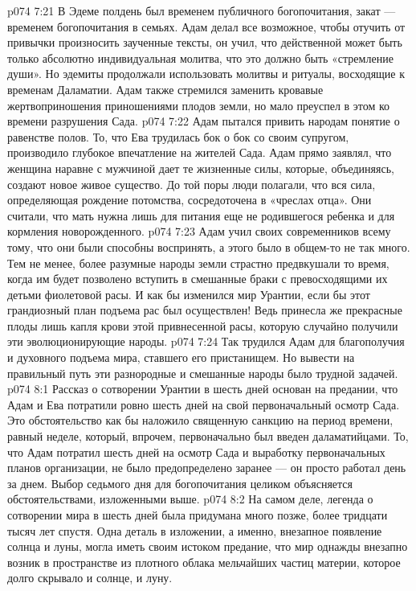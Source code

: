 \vs p074 7:21 В Эдеме полдень был временем публичного богопочитания, закат --- временем богопочитания в семьях. Адам делал все возможное, чтобы отучить от привычки произносить заученные тексты, он учил, что действенной может быть только абсолютно индивидуальная молитва, что это должно быть «стремление души». Но эдемиты продолжали использовать молитвы и ритуалы, восходящие к временам Даламатии. Адам также стремился заменить кровавые жертвоприношения приношениями плодов земли, но мало преуспел в этом ко времени разрушения Сада.
\vs p074 7:22 \pc Адам пытался привить народам понятие о равенстве полов. То, что Ева трудилась бок о бок со своим супругом, производило глубокое впечатление на жителей Сада. Адам прямо заявлял, что женщина наравне с мужчиной дает те жизненные силы, которые, объединяясь, создают новое живое существо. До той поры люди полагали, что вся сила, определяющая рождение потомства, сосредоточена в «чреслах отца». Они считали, что мать нужна лишь для питания еще не родившегося ребенка и для кормления новорожденного.
\vs p074 7:23 Адам учил своих современников всему тому, что они были способны воспринять, а этого было в общем\hyp{}то не так много. Тем не менее, более разумные народы земли страстно предвкушали то время, когда им будет позволено вступить в смешанные браки с превосходящими их детьми фиолетовой расы. И как бы изменился мир Урантии, если бы этот грандиозный план подъема рас был осуществлен! Ведь принесла же прекрасные плоды лишь капля крови этой привнесенной расы, которую случайно получили эти эволюционирующие народы.
\vs p074 7:24 Так трудился Адам для благополучия и духовного подъема мира, ставшего его пристанищем. Но вывести на правильный путь эти разнородные и смешанные народы было трудной задачей.
\vs p074 8:1 Рассказ о сотворении Урантии в шесть дней основан на предании, что Адам и Ева потратили ровно шесть дней на свой первоначальный осмотр Сада. Это обстоятельство как бы наложило священную санкцию на период времени, равный неделе, который, впрочем, первоначально был введен даламатийцами. То, что Адам потратил шесть дней на осмотр Сада и выработку первоначальных планов организации, не было предопределено заранее --- он просто работал день за днем. Выбор седьмого дня для богопочитания целиком объясняется обстоятельствами, изложенными выше.
\vs p074 8:2 На самом деле, легенда о сотворении мира в шесть дней была придумана много позже, более тридцати тысяч лет спустя. Одна деталь в изложении, а именно, внезапное появление солнца и луны, могла иметь своим истоком предание, что мир однажды внезапно возник в пространстве из плотного облака мельчайших частиц материи, которое долго скрывало и солнце, и луну.
